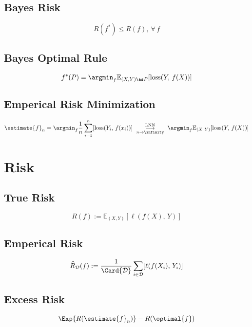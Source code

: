 \documentclass[18pt,a3paper,landscape, ncols=3]{cheatsheet}
\begin{document}
	\subsection{Bayes Risk}
		\begin{mdframed}
			\[
				R(f^*) \leq R(f),\ \forall\, f
			\]
		\end{mdframed}
	\subsection{Bayes Optimal Rule}
		\begin{mdframed}
			\[
				f^{*}(P) = \argmin_{f} \mathbb{E}_{(X,Y) \as P} [\mathrm{loss}(Y,\, f(X))]
			\]
		\end{mdframed}
	\subsection{Emperical Risk Minimization}
		\begin{mdframed}
			\[
				\estimate{f}_{n} = \argmin_{f} \frac{1}{n} \sum_{i=1}^{n} [\mathrm{loss}(Y_i,\, f(x_i))]\ \overset{\text{LNN}}{\underset{n \rightarrow \infinity}{\longrightarrow}}\ \argmin_{f} \mathbb{E}_{(X,\,Y)} [\mathrm{loss}(Y,\, f(X))]
			\]
		\end{mdframed}

\section{Risk} \seperator
	\subsection{True Risk}
		\begin{mdframed}
			\[
				R(f) := \mathbb{E}_{(X,Y)}[\ell(f(X),\, Y)]
			\]
		\end{mdframed}
	\subsection{Emperical Risk}
		\begin{mdframed}
			\[
				\widehat{R}_{\mathcal{D}}(f) := \frac{1}{\Card{\mathcal{D}}} \sum_{i \in \mathcal{D}} [\ell(f(X_i),\, Y_i)]
			\]
		\end{mdframed}
	\subsection{Excess Risk}
		\begin{mdframed}
			\[
				\Exp{R(\estimate{f}_{n})} - R(\optimal{f})
			\]
		\end{mdframed}
\end{document}
